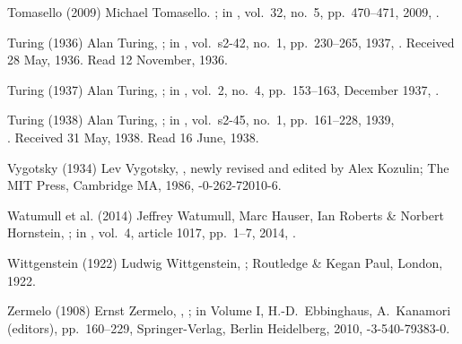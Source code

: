 \biblabel Tomasello (2009)
Michael Tomasello.
;
in ,
vol.\ 32, no.\ 5, pp.\ 470--471, 2009,
.

\biblabel Turing (1936)
Alan Turing,
;
in ,
vol.\ s2-42, no.\ 1, pp.\ 230--265, 1937,
.
Received 28 May, 1936. Read 12 November, 1936.

\biblabel Turing (1937)
Alan Turing,
; in
,
vol.\ 2, no.\ 4, pp.\ 153--163, December 1937,
.

\biblabel Turing (1938)
Alan Turing,
;
in ,
vol.\ s2-45, no.\ 1, pp.\ 161--228, 1939,\\
.
Received 31 May, 1938. Read 16 June, 1938.

\biblabel Vygotsky (1934)
Lev Vygotsky,
,
newly revised and edited by Alex Kozulin;
The MIT Press, Cambridge MA, 1986,
-0-262-72010-6.

\biblabel Watumull et al. (2014)
Jeffrey Watumull, Marc Hauser, Ian Roberts \& Norbert Hornstein,
; in
,
vol.\ 4, article 1017, pp.\ 1--7, 2014,
.

\biblabel Wittgenstein (1922)
Ludwig Wittgenstein,
;
Routledge \& Kegan Paul, London, 1922.

\biblabel Zermelo (1908)
Ernst Zermelo,
,
;
in  Volume I,
H.-D.\ Ebbinghaus, A.\ Kanamori (editors),
pp.\ 160--229,
Springer-Verlag, Berlin Heidelberg, 2010,
-3-540-79383-0.

\endinput

